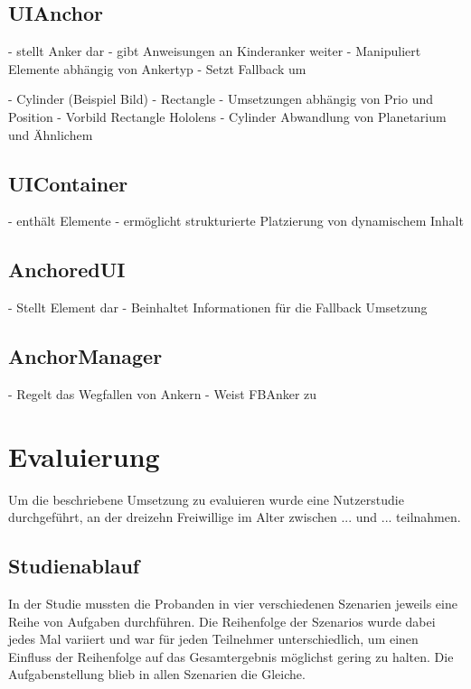 		\subsection{UIAnchor}
			- stellt Anker dar
			- gibt Anweisungen an Kinderanker weiter
			- Manipuliert Elemente abhängig von Ankertyp
			- Setzt Fallback um
			
			- Cylinder (Beispiel Bild)
			- Rectangle 
			- Umsetzungen abhängig von Prio und Position
			- Vorbild Rectangle Hololens
			- Cylinder Abwandlung von Planetarium und Ähnlichem
		
		\subsection{UIContainer}
			- enthält Elemente
			- ermöglicht strukturierte Platzierung von dynamischem Inhalt
		
		\subsection{AnchoredUI}
			- Stellt Element dar
			- Beinhaltet Informationen für die Fallback Umsetzung
		
		\subsection{AnchorManager}
			- Regelt das Wegfallen von Ankern
			- Weist FBAnker zu
			
	\section{Evaluierung}
		Um die beschriebene Umsetzung zu evaluieren wurde eine Nutzerstudie durchgeführt, an der dreizehn Freiwillige im Alter zwischen ... und ... teilnahmen. 
	
		\subsection{Studienablauf}
			In der Studie mussten die Probanden in vier verschiedenen Szenarien jeweils eine Reihe von Aufgaben durchführen. Die Reihenfolge der Szenarios wurde dabei jedes Mal variiert und war für jeden Teilnehmer unterschiedlich, um einen Einfluss der Reihenfolge auf das Gesamtergebnis möglichst gering zu halten. Die Aufgabenstellung blieb in allen Szenarien die Gleiche.
			
			
			
